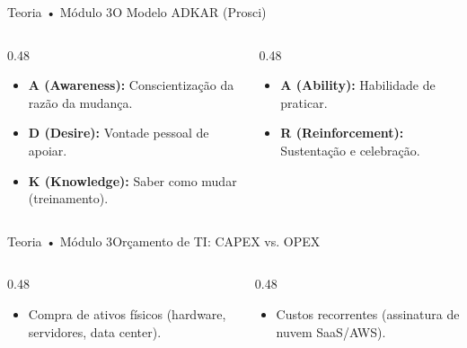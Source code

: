 \begin{senaiframe}{Teoria • Módulo 3}{O Modelo ADKAR (Prosci)}
  \begin{columns}[t]
    \begin{column}{0.48\textwidth}
      \begin{tcolorbox}[senaibluecard, title={Awareness, Desire, Knowledge}]
        \begin{itemize}
          \item \textbf{A (Awareness):} Conscientização da razão da mudança.
          \item \textbf{D (Desire):} Vontade pessoal de apoiar.
          \item \textbf{K (Knowledge):} Saber como mudar (treinamento).
        \end{itemize}
      \end{tcolorbox}
    \end{column}
    \begin{column}{0.48\textwidth}
      \begin{tcolorbox}[senaigreencard, title={Ability \& Reinforcement}]
        \begin{itemize}
          \item \textbf{A (Ability):} Habilidade de praticar.
          \item \textbf{R (Reinforcement):} Sustentação e celebração.
        \end{itemize}
      \end{tcolorbox}
    \end{column}
  \end{columns}
\end{senaiframe}

\begin{senaiframe}{Teoria • Módulo 3}{Orçamento de TI: CAPEX vs. OPEX}
  \begin{columns}[t]
    \begin{column}{0.48\textwidth}
      \begin{tcolorbox}[senaibluecard, title={CAPEX (Capital Expenditure)}]
        \begin{itemize}
          \item Compra de ativos físicos (hardware, servidores, data center).
        \end{itemize}
      \end{tcolorbox}
    \end{column}
    \begin{column}{0.48\textwidth}
      \begin{tcolorbox}[senaigreencard, title={OPEX (Operational Expenditure)}]
        \begin{itemize}
          \item Custos recorrentes (assinatura de nuvem SaaS/AWS).
        \end{itemize}
      \end{tcolorbox}
    \end{column}
  \end{columns}
\end{senaiframe}


